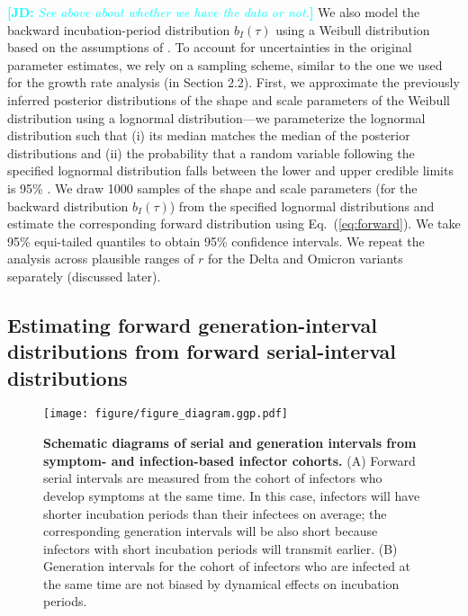 \documentclass[12pt]{article}
\newcommand{\comment}{\showcomment}
\newcommand{\showcomment}[3]{\textcolor{#1}{\textbf{[#2: }\textsl{#3}\textbf{]}}}
\newcommand{\jd}[1]{\comment{cyan}{JD}{#1}}
\newcommand{\eref}[1]{Eq.~(\ref{eq:#1})}
\begin{document}
\jd{See above about whether we have the data or not.}
We also model the backward incubation-period distribution $b_I(\tau)$ using a Weibull distribution based on the assumptions of \cite{backer2021omicron}.
To account for uncertainties in the original parameter estimates, we rely on a sampling scheme, similar to the one we used for the growth rate analysis (in Section 2.2).
First, we approximate the previously inferred posterior distributions of the shape and scale parameters of the Weibull distribution using a lognormal distribution---we parameterize the lognormal distribution such that (i) its median matches the median of the posterior distributions and (ii) the probability that a random variable following the specified lognormal distribution falls between the lower and upper credible limits is 95\% \citep{park2020reconciling}.
We draw 1000 samples of the shape and scale parameters (for the backward distribution $b_I(\tau)$) from the specified lognormal distributions and estimate the corresponding forward distribution using \eref{forward}.
We take 95\% equi-tailed quantiles to obtain 95\% confidence intervals.
We repeat the analysis across plausible ranges of $r$ for the Delta and Omicron variants separately (discussed later).

\subsection{Estimating forward generation-interval distributions from forward serial-interval distributions}

\begin{figure}[!tp]
\texttt{[image: figure/figure\_diagram.ggp.pdf]}
\caption{
\textbf{Schematic diagrams of serial and generation intervals from symptom- and infection-based infector cohorts.}
(A) Forward serial intervals are measured from the cohort of infectors who develop symptoms at the same time. 
In this case, infectors will have shorter incubation periods than their infectees on average; the corresponding generation intervals will be also short because infectors with short incubation periods will transmit earlier.
(B) Generation intervals for the cohort of infectors who are infected at the same time are not biased by dynamical effects on incubation periods.
\label{fig:diagram}
}
\end{figure}
\end{document}
